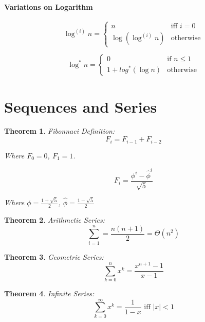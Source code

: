 \documentclass[a4paper,12pt]{report}
\newtheorem{theorem}{Theorem}
\begin{document}
\paragraph{Variations on Logarithm} 

\begin{equation}
\log^{(i)} n = \begin{cases}
n & \text{iff } i = 0 \\
\log(\log^{(i)} n) & \text{otherwise}
\end{cases}
\end{equation}

\begin{equation}
\log^* n = \begin{cases}
0 & \text{if } n \leq 1 \\
1 + log^*(\log n) & \text{otherwise}
\end{cases}
\end{equation}


\section{Sequences and Series}

\begin{theorem}{Fibonnaci Definition:}
\begin{equation}
F_i = F_{i-1} + F_{i-2}
\end{equation}

Where $F_0 = 0$, $F_1 = 1$.

\begin{equation}
F_i = \frac{\phi^i - \hat \phi^i}{\sqrt{5}}
\end{equation}

Where $\phi = \frac{1+\sqrt{5}}{2}$, $\hat \phi = \frac{1-\sqrt 5}{2}$
\end{theorem}


\begin{theorem}{Arithmetic Series:}
\begin{equation}
\sum_{i=1}^{n} = \frac{n(n+1)}{2} = \Theta(n^2)
\end{equation}
\end{theorem}


\begin{theorem}{Geometric Series:}
\begin{equation}
\sum_{k=0}^{n} x^k = \frac{x^{n+1}-1}{x-1} 
\end{equation}
\end{theorem}


\begin{theorem}{Infinite Series:}
\begin{equation}
\sum_{k=0}^{\infty} x^k = \frac{1}{1-x} \text{ iff } |x| < 1
\end{equation}
\end{theorem}
\end{document}
